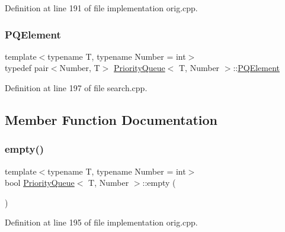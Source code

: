 Definition at line 191 of file implementation orig.\+cpp.

\mbox{\label{struct_priority_queue_ae86a19aae3f9a32a1d76dfdab34eb70b}} 
\subsubsection{\texorpdfstring{P\+Q\+Element}{PQElement}\hspace{0.1cm}{\footnotesize\ttfamily [2/2]}}
{\footnotesize\ttfamily template$<$typename T, typename Number = int$>$ \\
typedef pair$<$Number, T$>$ \mbox{\hyperlink{struct_priority_queue}{Priority\+Queue}}$<$ T, Number $>$\+::\mbox{\hyperlink{struct_priority_queue_ae86a19aae3f9a32a1d76dfdab34eb70b}{P\+Q\+Element}}}



Definition at line 197 of file search.\+cpp.



\subsection{Member Function Documentation}
\mbox{\label{struct_priority_queue_a422e38d0c3b8398dc6e4867bb4ceec41}} 
\subsubsection{\texorpdfstring{empty()}{empty()}\hspace{0.1cm}{\footnotesize\ttfamily [1/2]}}
{\footnotesize\ttfamily template$<$typename T, typename Number = int$>$ \\
bool \mbox{\hyperlink{struct_priority_queue}{Priority\+Queue}}$<$ T, Number $>$\+::empty (\begin{DoxyParamCaption}{ }\end{DoxyParamCaption})\hspace{0.3cm}{\ttfamily [inline]}}



Definition at line 195 of file implementation orig.\+cpp.

